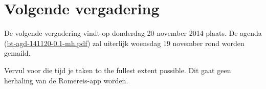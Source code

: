 \documentclass[a4paper, 10pt]{article}
\begin{document}
\section{Volgende vergadering}
De volgende vergadering vindt op donderdag 20 november 2014 plaats. De agenda
(\url{bt-agd-141120-0.1-mh.pdf}) zal uiterlijk woensdag 19 november rond worden
gemaild.

Vervul voor die tijd je taken to the fullest extent possible. Dit gaat geen
herhaling van de Romereis-app worden.
\end{document}
